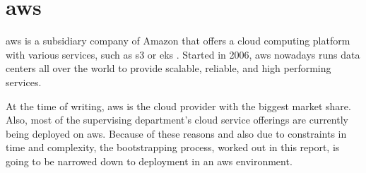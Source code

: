 
\section{\ac{aws}}
\acf{aws} is a subsidiary company of Amazon that offers a cloud computing platform with various services, such as \ac{s3} \cite{aws.s3} or \ac{eks} \cite{aws.eks}.
Started in 2006, \ac{aws} nowadays runs data centers all over the world to provide scalable, reliable, and high performing services. \cite{aws.linkedin, whatisaws}

At the time of writing, \ac{aws} is the cloud provider with the biggest market share. \cite{aws.marketshare}
Also, most of the supervising department's cloud service offerings are currently being deployed on \ac{aws}.
Because of these reasons and also due to constraints in time and complexity, the bootstrapping process, worked out in this report, is going to be narrowed down to deployment in an \ac{aws} environment.

